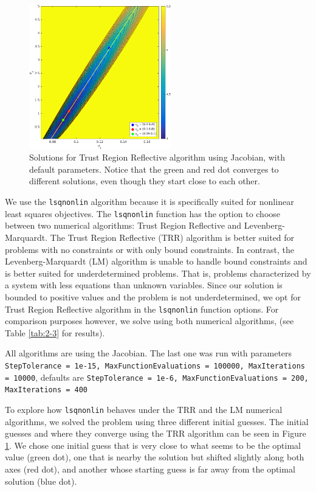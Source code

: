 \begin{figure}[htb]
\centering
\includegraphics[width=0.55\textwidth]{../img/2-3Phi}
\caption{Solutions for Trust Region Reflective algorithm using Jacobian, with default parameters. Notice that the green and red dot converges to different solutions, even though they start close to each other.}
\label{fig:2-3Phi}
\end{figure}


We use the \verb+lsqnonlin+ algorithm because it is specifically suited for nonlinear least squares objectives. The \verb+lsqnonlin+ function has the option to choose between two numerical algorithms: Trust Region Reflective and Levenberg-Marquardt. The Trust Region Reflective (TRR) algorithm is better suited for problems with no constraints or with only bound constraints. In contrast, the Levenberg-Marquardt (LM) algorithm is unable to handle bound constraints and is better suited for underdetermined problems. That is, problems characterized by a system with less equations than unknown variables. Since our solution is bounded to positive values and the problem is not underdetermined, we opt for Trust Region Reflective algorithm in the \verb+lsqnonlin+ function options. For comparison purposes however, we solve using both numerical algorithms, (see Table \ref{tab:2-3} for results).    

\begin{table}[H]
\centering
\footnotesize

\caption{All algorithms are using the Jacobian. The last one was run with parameters \texttt{StepTolerance = 1e-15, MaxFunctionEvaluations = 100000, MaxIterations = 10000}, defaults are \texttt{StepTolerance = 1e-6, MaxFunctionEvaluations = 200, MaxIterations = 400}}
\label{tab:2-3}
\end{table}

To explore how \verb+lsqnonlin+ behaves under the TRR and the LM numerical algorithms, we solved the problem using three different initial guesses. The initial guesses and where they converge using the TRR algorithm can be seen in Figure \ref{fig:2-3Phi}. We chose one initial guess that is very close to what seems to be the optimal value (green dot), one that is nearby the solution but shifted slightly along both axes (red dot), and another whose starting guess is far away from the optimal solution (blue dot). 

